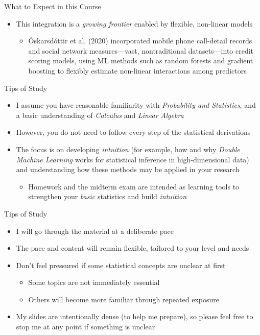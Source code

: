 \documentclass[aspectratio=1610,12pt,xcolor=dvipsnames]{beamer}
\begin{document}
\begin{frame}{What to Expect in this Course}
\begin{itemize}
    \item This integration is a \textit{growing frontier} enabled by flexible, non-linear models
    \begin{itemize}
        \item Óskarsdóttir et al. (2020) incorporated mobile phone call-detail records and social network measures—vast, nontraditional datasets—into credit scoring models, using ML methods such as random forests and gradient boosting to flexibly estimate non-linear interactions among predictors
    \end{itemize}
    \end{itemize}
\end{frame}

\begin{frame}{Tips of Study}
\begin{itemize}
    \item I assume you have reasonable familiarity with \textit{Probability and Statistics}, and a basic understanding of \textit{Calculus} and \textit{Linear Algebra}
    \item However, you do not need to follow every step of the statistical derivations
    \item The focus is on developing \textit{intuition} (for example, how and why \textit{Double Machine Learning} works for statistical inference in high-dimensional data) and understanding how these methods may be applied in your research
    \begin{itemize}
        \item Homework and the midterm exam are intended as learning tools to strengthen your \textit{basic} statistics and build \textit{intuition}
    \end{itemize}
\end{itemize}
\end{frame}

\begin{frame}{Tips of Study}
\begin{itemize}
    \item I will go through the material at a deliberate pace
    \item The pace and content will remain flexible, tailored to your level and needs
    \item Don’t feel pressured if some statistical concepts are unclear at first
    \begin{itemize}
        \item Some topics are not immediately essential
        \item Others will become more familiar through repeated exposure
    \end{itemize}
    \item My slides are intentionally dense (to help me prepare), so please feel free to stop me at any point if something is unclear
\end{itemize}
\end{frame}
\end{document}
